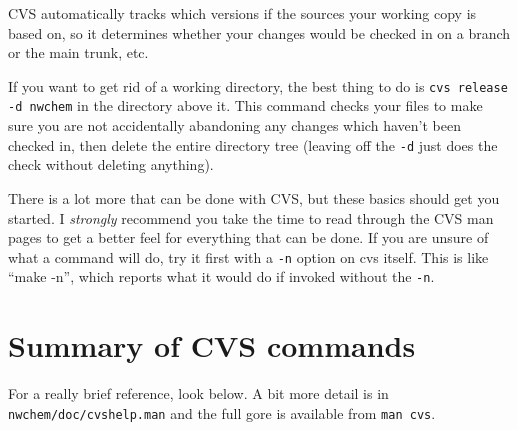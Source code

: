 CVS automatically tracks which versions if the sources your working
copy is based on, so it determines whether your changes would be
checked in on a branch or the main trunk, etc.

If you want to get rid of a working directory, the best thing to do is
{\tt cvs release -d nwchem} in the directory above it.  This command
checks your files to make sure you are not accidentally abandoning any
changes which haven't been checked in, then delete the entire
directory tree (leaving off the {\tt -d} just does the check without
deleting anything).

There is a lot more that can be done with CVS, but these basics should
get you started.  I {\em strongly} recommend you take the time to read
through the CVS man pages to get a better feel for everything that can
be done.  If you are unsure of what a command will do, try it first
with a {\tt -n} option on cvs itself.  This is like ``make -n'', which
reports what it would do if invoked without the {\tt -n}.

\section{Summary of CVS commands}

For a really brief reference, look below.  A bit more detail is in
\verb+nwchem/doc/cvshelp.man+ and the full gore is available from
\verb+man cvs+.

